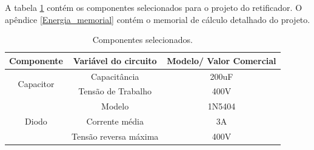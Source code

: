 A tabela \ref{retificador_componentes} contém os componentes selecionados para o projeto do retificador. O apêndice \ref{Energia_memorial} contém o memorial de cálculo detalhado do projeto.

\begin{table}[H]
    \centering
    \caption{Componentes selecionados.}
    \label{retificador_componentes}
    \begin{adjustbox}{max width = \textwidth}
        \begin{tabular}{|c|c|c|}
            \hline
            \rowcolor[HTML]{A8DADC}
            \textbf{Componente} & \textbf{Variável do circuito} & \textbf{Modelo/ Valor Comercial}\\ \hline
            \multirow{2}{*}{Capacitor}& Capacitância & 200uF\\ \cline{2-3} 
            & Tensão de Trabalho & 400V
            \\ \hline 
            \multirow{3}{*}{Diodo}& Modelo & 1N5404 \\ \cline{2-3}
            & Corrente média & 3A \\ \cline{2-3} 
            & Tensão reversa máxima & 400V
             \\ \hline 
        \end{tabular}
    \end{adjustbox}
\end{table}



